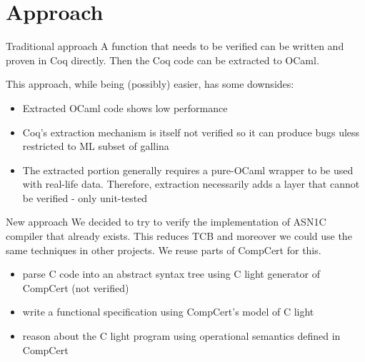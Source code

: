 \documentclass{beamer}
\begin{document}
\section{Approach}

\begin{frame}{Traditional approach}
   A function that needs to be verified can be written and proven in Coq directly. Then the Coq code can be extracted to OCaml.
   
   This approach, while being (possibly) easier, has some downsides:
\begin{itemize}
  \item Extracted OCaml code shows low performance
  \item Coq's extraction mechanism is itself not verified so it can produce bugs uless restricted to ML subset of gallina
  \item The extracted portion generally requires a pure-OCaml wrapper to be used with real-life data. Therefore, extraction necessarily adds a layer that cannot be verified - only unit-tested
\end{itemize}
\end{frame}
   
\begin{frame}{New approach}
  We decided to try to verify the implementation of ASN1C compiler that already exists. This reduces TCB and moreover we could use the same techniques in other projects. We reuse parts of CompCert for this.
\begin{itemize}
  \item parse C code into an abstract syntax tree using C light generator of CompCert (not verified)
  \item write a functional specification using CompCert's model of C light 
  \item reason about the C light program using operational semantics defined in CompCert
\end{itemize}
\end{frame}



  
\end{document}
